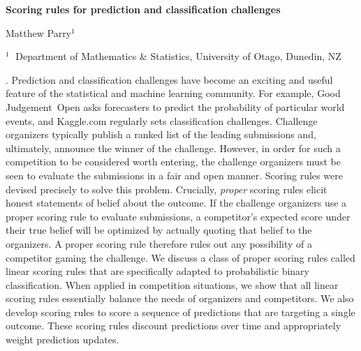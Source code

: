 \documentclass[12pt]{article}
\begin{document}
\begin{flushleft}


{\LARGE\bf Scoring rules for prediction and classification challenges}


\vspace{1.0cm}

Matthew Parry$^1$

\begin{description}

\item $^1 \;$ Department of Mathematics \& Statistics, University of Otago, Dunedin, NZ


\end{description}

\end{flushleft}


\vspace{0.75cm}

. Prediction and classification challenges have become an exciting and useful feature of the statistical and machine learning community. For example, Good Judgement\textregistered\ Open asks forecasters to predict the probability of particular world events, and Kaggle.com regularly sets classification challenges. Challenge organizers typically publish a ranked list of the leading submissions and, ultimately, announce the winner of the challenge. However, in order for such a competition to be considered worth entering, the challenge organizers must be seen to evaluate the submissions in a fair and open manner. Scoring rules were devised precisely to solve this problem. Crucially, {\em proper} scoring rules elicit honest statements of belief about the outcome. If the challenge organizers use a proper scoring rule to evaluate submissions, a competitor's expected score under their true belief will be optimized by actually quoting that belief to the organizers. A proper scoring rule therefore rules out any possibility of a competitor gaming the challenge. We discuss a class of proper scoring rules called linear scoring rules that are specifically adapted to probabilistic binary classification. When applied in competition situations, we show that all linear scoring rules essentially balance the needs of organizers and competitors. We also develop scoring rules to score a sequence of predictions that are targeting a single outcome. These scoring rules discount predictions over time and appropriately weight prediction updates.
\end{document}

